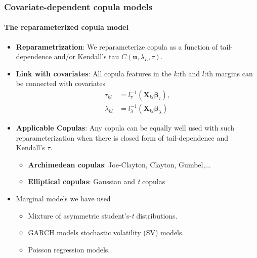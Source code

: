 \documentclass[10pt]{beamer}
\begin{document}
\begin{frame}
  \frametitle{Covariate-dependent copula models}
  \framesubtitle{The reparameterized copula model}
  \begin{itemize}


  \item \textbf{Reparametrization}: We reparameterize copula as a function of
    tail-dependence and/or Kendall's tau $C(\bm{u},\lambda_L,\tau)$.

  \item \textbf{Link with covariates}: All copula features in the $k$:th and $l$:th margins can be connected with
    covariates
      \begin{align*}
        \tau_{kl}&=l_{\tau}^{-1}(\bm{X}_{kl}\bm{\beta}_{\tau}),\\
        \lambda_{kl}&=l_{\lambda}^{-1}(\bm{X}_{kl}\bm{\beta}_{\lambda})
      \end{align*}

    \item \textbf{Applicable Copulas}: Any copula can be equally well used with such
      reparameterization when there is closed form of tail-dependence and Kendall's
      $\tau$.

    \begin{itemize}
    \item \textbf{Archimedean copulas}: Joe-Clayton, Clayton, Gumbel,...
    \item \textbf{Elliptical copulas}: Gaussian and \emph{t} copulas
    \end{itemize}

  \item Marginal models we have used

    \begin{itemize}
    \item Mixture of asymmetric student's-\emph{t} distributions.
    \item GARCH models stochastic volatility (SV) models.
    \item Poisson regression models.
    \end{itemize}

  \end{itemize}
\end{frame}
\end{document}
